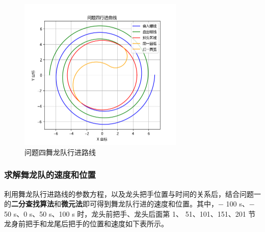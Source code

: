 \documentclass[a4paper]{article}
\begin{document}
		\begin{figure}[H]
			\centering
			\includegraphics[width=0.7\textwidth]{image/Figure_5412.png}
			\caption{问题四舞龙队行进路线}
			\label{Figure_5412}
		\end{figure}
	
	\subsubsection{求解舞龙队的速度和位置}
	
		利用舞龙队行进路线的参数方程，以及龙头把手位置与时间的关系后，结合问题一的\textbf{二分查找算法}和\textbf{微元法}即可得到舞龙队行进的速度和位置。其中，− 100 s、− 50 s、0 s、50 s、100 s 时，龙头前把手、龙头后面第 1、
		51、101、151、201 节龙身前把手和龙尾后把手的位置和速度如下表所示。
\end{document}
